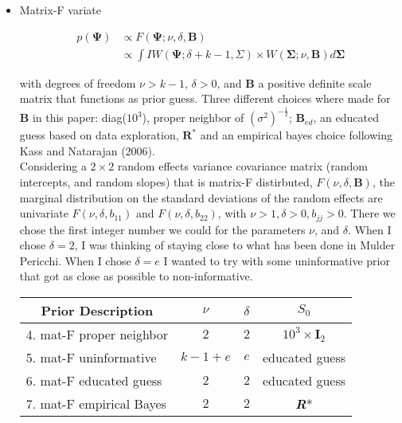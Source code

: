 \documentclass[a4paper]{article}
\begin{document}
\begin{itemize}
	\item Matrix-F variate
	
\begin{equation}
\begin{split}
p(\bm{\Psi})& \propto F(\bm{\Psi}; \nu, \delta, \bm{B}) \\
& \propto \int IW(\bm{\Psi}; \delta + k - 1, \Sigma) \times W(\bm{\Sigma}; \nu, \bm{B})d\bm{\Sigma}
\end{split}
\end{equation}	

with degrees of freedom $\nu>k-1$, $\delta>0$, and $\bm{B}$ a positive definite scale matrix that functions as prior guess. Three different choices where made for $\bm{B}$ in this paper: diag($10^3$), proper neighbor of $(\sigma^2)^{-\frac{1}{2}}$; $\bm{B}_{ed}$, an educated guess based on data exploration, $\bm{R^*}$ and an empirical bayes choice following Kass and Natarajan (2006). \\
Considering a $2 \times 2$ random effects variance covariance matrix (random intercepts, and random slopes) that is matrix-F distirbuted, $F(\nu, \delta, \bm{B})$, the marginal distribution on the standard deviations of the random effects are univariate $F(\nu, \delta, b_{11})$ and $F(\nu, \delta, b_{22})$, with $\nu >1, \delta > 0, b_{jj} > 0$. There we chose the first integer number we could for the parameters $\nu$, and $\delta$. When I chose $\delta = 2$, I was thinking of staying close to what has been done in Mulder Pericchi. When I chose $\delta=e$ I wanted to try with some uninformative prior that got as close as possible to non-informative.

\begin{center}
\begin{tabular}{ c c c c }
 Prior Description & $\nu$ & $\delta$ & $S_{0}$ \\ 
 \hline
 \multicolumn{1}{l}{4. mat-F proper neighbor} & $2$ & $2$ & $10^3 \times \bm{I}_2$ \\
 \multicolumn{1}{l}{5. mat-F uninformative} & $k-1+e$ & $e$ & educated guess \\
 \multicolumn{1}{l}{6. mat-F educated guess} & $2$ & $2$ & educated guess \\ 
 \multicolumn{1}{l}{7. mat-F empirical Bayes} & $2$ & $2$ & \textbf{\textit{R}}* \\
 \hline
\end{tabular}
\end{center}

\end{itemize}
\end{document}
